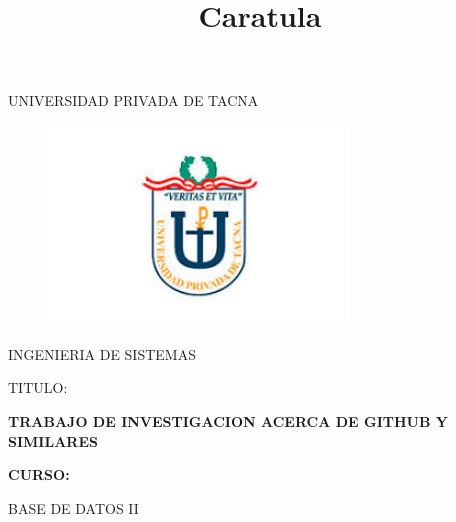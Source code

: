 \documentclass[12pt,letterpaper]{article}
\begin{document}
%


\title{Caratula}

\begin{titlepage}
\begin{center}
\large{UNIVERSIDAD PRIVADA DE TACNA}\\
\vspace*{-0.025in}
\begin{figure}[htb]
\begin{center}
\includegraphics[width=8cm]{./Imagenes/logo}
\end{center}
\end{figure}
\vspace*{0.15in}
INGENIERIA DE SISTEMAS  \\

\vspace*{0.5in}
\begin{large}
TITULO:\\
\end{large}

\vspace*{0.1in}
\begin{Large}
\textbf{TRABAJO DE INVESTIGACION ACERCA DE GITHUB Y SIMILARES} \\
\end{Large}

\vspace*{0.3in}
\begin{Large}
\textbf{CURSO:} \\
\end{Large}

\vspace*{0.1in}
\begin{large}
BASE DE DATOS II\\
\end{large}


\end{center}
\end{titlepage}
\end{document}
